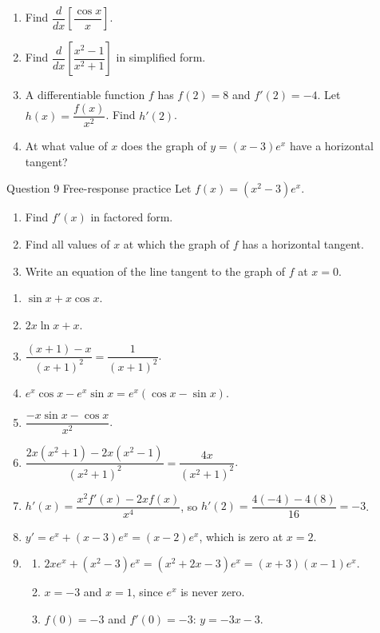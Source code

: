 \documentclass[11pt]{article}
\begin{document}
\begin{enumerate}[leftmargin=*,itemsep=2pt,start=5]
  \item Find $\dfrac{d}{dx}\left[\dfrac{\cos x}{x}\right]$.\work{2.8cm}
  \item Find $\dfrac{d}{dx}\left[\dfrac{x^2-1}{x^2+1}\right]$ in simplified form.\work{2.8cm}
  \item A differentiable function $f$ has $f(2)=8$ and $f'(2)=-4$. Let $h(x)=\dfrac{f(x)}{x^2}$. Find $h'(2)$.\work{2.8cm}
  \item At what value of $x$ does the graph of $y=(x-3)e^{x}$ have a horizontal tangent?\work{2.8cm}
\end{enumerate}

\begin{frbox}{Question 9 \textperiodcentered{} Free-response practice}
Let $f(x)=\left(x^2-3\right)e^{x}$.
\begin{enumerate}[label=(\alph*),leftmargin=*,itemsep=2pt]
  \item Find $f'(x)$ in factored form.\work{2.6cm}
  \item Find all values of $x$ at which the graph of $f$ has a horizontal tangent.\work{2.6cm}
  \item Write an equation of the line tangent to the graph of $f$ at $x=0$.\work{2.6cm}
\end{enumerate}
\end{frbox}

\newpage
\begin{solbox}
\begin{enumerate}[leftmargin=*,itemsep=4pt]
  \item $\sin x+x\cos x$.
  \item $2x\ln x+x$.
  \item $\dfrac{(x+1)-x}{(x+1)^2}=\dfrac{1}{(x+1)^2}$.
  \item $e^{x}\cos x-e^{x}\sin x=e^{x}(\cos x-\sin x)$.
  \item $\dfrac{-x\sin x-\cos x}{x^2}$.
  \item $\dfrac{2x(x^2+1)-2x(x^2-1)}{(x^2+1)^2}=\dfrac{4x}{(x^2+1)^2}$.
  \item $h'(x)=\dfrac{x^2f'(x)-2xf(x)}{x^4}$, so $h'(2)=\dfrac{4(-4)-4(8)}{16}=-3$.
  \item $y'=e^{x}+(x-3)e^{x}=(x-2)e^{x}$, which is zero at $x=2$.
  \item \begin{enumerate}[label=(\alph*),leftmargin=*,itemsep=3pt]
    \item $2xe^{x}+\left(x^2-3\right)e^{x}=\left(x^2+2x-3\right)e^{x}=(x+3)(x-1)e^{x}$.
    \item $x=-3$ and $x=1$, since $e^{x}$ is never zero.
    \item $f(0)=-3$ and $f'(0)=-3$: $y=-3x-3$.
  \end{enumerate}
\end{enumerate}
\end{solbox}
\end{document}
